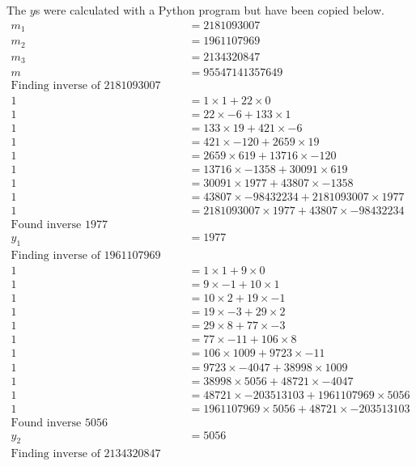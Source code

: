 \documentclass{article}
\begin{document}
The $y$s were calculated with a Python program but have been copied below.
\begin{align*}
    m_1 &= 2181093007 \\
    m_2 &= 1961107969 \\
    m_3 &= 2134320847 \\
    m &= 95547141357649 \\
    \text{Finding inverse of 2181093007 mod 43807} \\
    1 &= 1 \times 1 + 22 \times 0 \\
    1 &= 22 \times -6 + 133 \times 1 \\
    1 &= 133 \times 19 + 421 \times -6 \\
    1 &= 421 \times -120 + 2659 \times 19 \\
    1 &= 2659 \times 619 + 13716 \times -120 \\
    1 &= 13716 \times -1358 + 30091 \times 619 \\
    1 &= 30091 \times 1977 + 43807 \times -1358 \\
    1 &= 43807 \times -98432234 + 2181093007 \times 1977 \\
    1 &= 2181093007 \times 1977 + 43807 \times -98432234 \\
    \text{Found inverse 1977} \\
    y_1 &= 1977 \\
    \text{Finding inverse of 1961107969 mod 48721} \\
    1 &= 1 \times 1 + 9 \times 0 \\
    1 &= 9 \times -1 + 10 \times 1 \\
    1 &= 10 \times 2 + 19 \times -1 \\
    1 &= 19 \times -3 + 29 \times 2 \\
    1 &= 29 \times 8 + 77 \times -3 \\
    1 &= 77 \times -11 + 106 \times 8 \\
    1 &= 106 \times 1009 + 9723 \times -11 \\
    1 &= 9723 \times -4047 + 38998 \times 1009 \\
    1 &= 38998 \times 5056 + 48721 \times -4047 \\
    1 &= 48721 \times -203513103 + 1961107969 \times 5056 \\
    1 &= 1961107969 \times 5056 + 48721 \times -203513103 \\
    \text{Found inverse 5056} \\
    y_2 &= 5056 \\
    \text{Finding inverse of 2134320847 mod 44767} \\

\end{align*}
\end{document}
